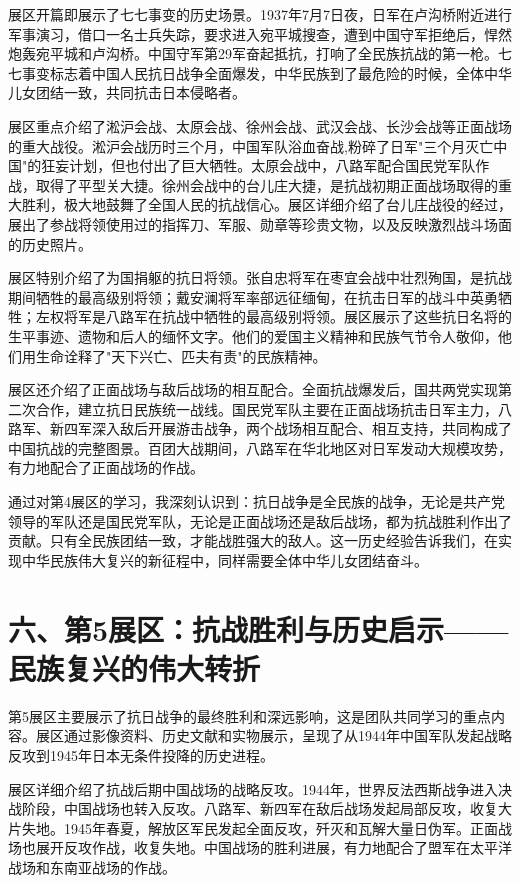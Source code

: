 \documentclass[a4paper,12pt]{article}
\begin{document}
展区开篇即展示了七七事变的历史场景。1937年7月7日夜，日军在卢沟桥附近进行军事演习，借口一名士兵失踪，要求进入宛平城搜查，遭到中国守军拒绝后，悍然炮轰宛平城和卢沟桥。中国守军第29军奋起抵抗，打响了全民族抗战的第一枪。七七事变标志着中国人民抗日战争全面爆发，中华民族到了最危险的时候，全体中华儿女团结一致，共同抗击日本侵略者。

展区重点介绍了淞沪会战、太原会战、徐州会战、武汉会战、长沙会战等正面战场的重大战役。淞沪会战历时三个月，中国军队浴血奋战,粉碎了日军"三个月灭亡中国"的狂妄计划，但也付出了巨大牺牲。太原会战中，八路军配合国民党军队作战，取得了平型关大捷。徐州会战中的台儿庄大捷，是抗战初期正面战场取得的重大胜利，极大地鼓舞了全国人民的抗战信心。展区详细介绍了台儿庄战役的经过，展出了参战将领使用过的指挥刀、军服、勋章等珍贵文物，以及反映激烈战斗场面的历史照片。

展区特别介绍了为国捐躯的抗日将领。张自忠将军在枣宜会战中壮烈殉国，是抗战期间牺牲的最高级别将领；戴安澜将军率部远征缅甸，在抗击日军的战斗中英勇牺牲；左权将军是八路军在抗战中牺牲的最高级别将领。展区展示了这些抗日名将的生平事迹、遗物和后人的缅怀文字。他们的爱国主义精神和民族气节令人敬仰，他们用生命诠释了"天下兴亡、匹夫有责"的民族精神。

展区还介绍了正面战场与敌后战场的相互配合。全面抗战爆发后，国共两党实现第二次合作，建立抗日民族统一战线。国民党军队主要在正面战场抗击日军主力，八路军、新四军深入敌后开展游击战争，两个战场相互配合、相互支持，共同构成了中国抗战的完整图景。百团大战期间，八路军在华北地区对日军发动大规模攻势，有力地配合了正面战场的作战。

通过对第4展区的学习，我深刻认识到：抗日战争是全民族的战争，无论是共产党领导的军队还是国民党军队，无论是正面战场还是敌后战场，都为抗战胜利作出了贡献。只有全民族团结一致，才能战胜强大的敌人。这一历史经验告诉我们，在实现中华民族伟大复兴的新征程中，同样需要全体中华儿女团结奋斗。

\section*{\songti{}\textbf{六、第5展区：抗战胜利与历史启示——民族复兴的伟大转折}}

第5展区主要展示了抗日战争的最终胜利和深远影响，这是团队共同学习的重点内容。展区通过影像资料、历史文献和实物展示，呈现了从1944年中国军队发起战略反攻到1945年日本无条件投降的历史进程。

展区详细介绍了抗战后期中国战场的战略反攻。1944年，世界反法西斯战争进入决战阶段，中国战场也转入反攻。八路军、新四军在敌后战场发起局部反攻，收复大片失地。1945年春夏，解放区军民发起全面反攻，歼灭和瓦解大量日伪军。正面战场也展开反攻作战，收复失地。中国战场的胜利进展，有力地配合了盟军在太平洋战场和东南亚战场的作战。
\end{document}
